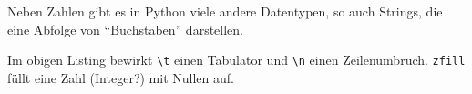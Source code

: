 Neben Zahlen gibt es in Python viele andere Datentypen, so auch Strings, die eine Abfolge von ``Buchstaben'' darstellen. 



Im obigen Listing bewirkt \texttt{\textbackslash t} einen Tabulator und \texttt{\textbackslash n} einen Zeilenumbruch.
\texttt{zfill} füllt eine Zahl (Integer?) mit Nullen auf.

% 

